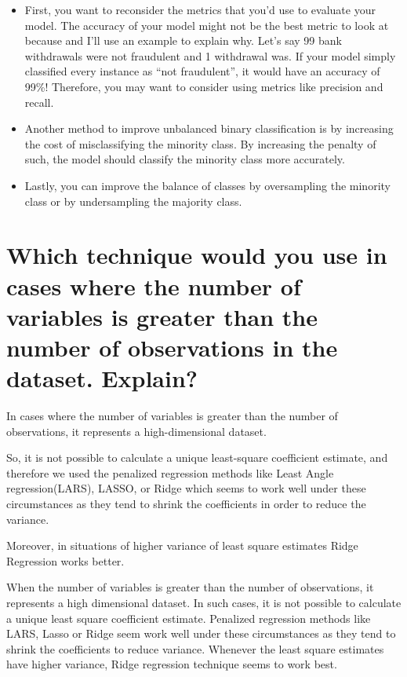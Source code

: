 \documentclass[
]{book}
\begin{document}
\begin{itemize}
\item
  First, you want to reconsider the metrics that you'd use to evaluate your model. The accuracy of your model might not be the best metric to look at because and I'll use an example to explain why. Let's say 99 bank withdrawals were not fraudulent and 1 withdrawal was. If your model simply classified every instance as ``not fraudulent'', it would have an accuracy of 99\%! Therefore, you may want to consider using metrics like precision and recall.
\item
  Another method to improve unbalanced binary classification is by increasing the cost of misclassifying the minority class. By increasing the penalty of such, the model should classify the minority class more accurately.
\item
  Lastly, you can improve the balance of classes by oversampling the minority class or by undersampling the majority class.
\end{itemize}

\hypertarget{which-technique-would-you-use-in-cases-where-the-number-of-variables-is-greater-than-the-number-of-observations-in-the-dataset.-explain}{%
\section{Which technique would you use in cases where the number of variables is greater than the number of observations in the dataset. Explain?}\label{which-technique-would-you-use-in-cases-where-the-number-of-variables-is-greater-than-the-number-of-observations-in-the-dataset.-explain}}

In cases where the number of variables is greater than the number of observations, it represents a high-dimensional dataset.

So, it is not possible to calculate a unique least-square coefficient estimate, and therefore we used the penalized regression methods like Least Angle regression(LARS), LASSO, or Ridge which seems to work well under these circumstances as they tend to shrink the coefficients in order to reduce the variance.

Moreover, in situations of higher variance of least square estimates Ridge Regression works better.

When the number of variables is greater than the number of observations, it represents a high dimensional dataset. In such cases, it is not possible to calculate a unique least square coefficient estimate. Penalized regression methods like LARS, Lasso or Ridge seem work well under these circumstances as they tend to shrink the coefficients to reduce variance. Whenever the least square estimates have higher variance, Ridge regression technique seems to work best.
\end{document}
